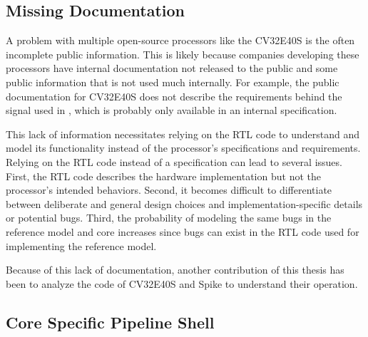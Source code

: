 \subsection{Missing Documentation}

A problem with multiple open-source processors like the CV32E40S is the often incomplete public information. This is likely because companies developing these processors have internal documentation not released to the public and some public information that is not used much internally. For example, the public documentation for CV32E40S \cite{openhwgroupIntroductionCOREVCV32E40S2023} does not describe the requirements behind the  signal used in , which is probably only available in an internal specification.

This lack of information necessitates relying on the RTL code to understand and model its functionality instead of the processor's specifications and requirements.
Relying on the RTL code instead of a specification can lead to several issues. First, the RTL code describes the hardware implementation but not the processor's intended behaviors. Second, it becomes difficult to differentiate between deliberate and general design choices and implementation-specific details or potential bugs. Third, the probability of modeling the same bugs in the reference model and core increases since bugs can exist in the RTL code used for implementing the reference model.

Because of this lack of documentation, another contribution of this thesis has been to analyze the code of CV32E40S and Spike to understand their operation.

\subsection{Core Specific Pipeline Shell}





